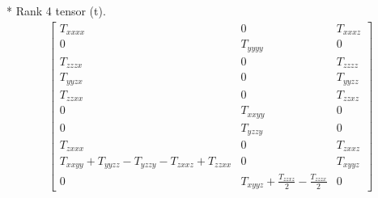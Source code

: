 \documentclass[fleqn,8pt,landscape]{jsarticle}
\begin{document}
* Rank 4 tensor (t).
\begin{align*}
\begin{bmatrix} T_{xxxx} & 0 & T_{xxxz} \\ 0 & T_{yyyy} & 0 \\ T_{zzzx} & 0 & T_{zzzz} \\ T_{yyzx} & 0 & T_{yyzz} \\ T_{zzxx} & 0 & T_{zzxz} \\ 0 & T_{xxyy} & 0 \\ 0 & T_{yzzy} & 0 \\ T_{zxxx} & 0 & T_{zxxz} \\ T_{xxyy} + T_{yyzz} - T_{yzzy} - T_{zxxz} + T_{zzxx} & 0 & T_{xyyz} \\ 0 & T_{xyyz} + \frac{T_{zzxz}}{2} - \frac{T_{zzzx}}{2} & 0 \end{bmatrix}
\end{align*}
\end{document}
